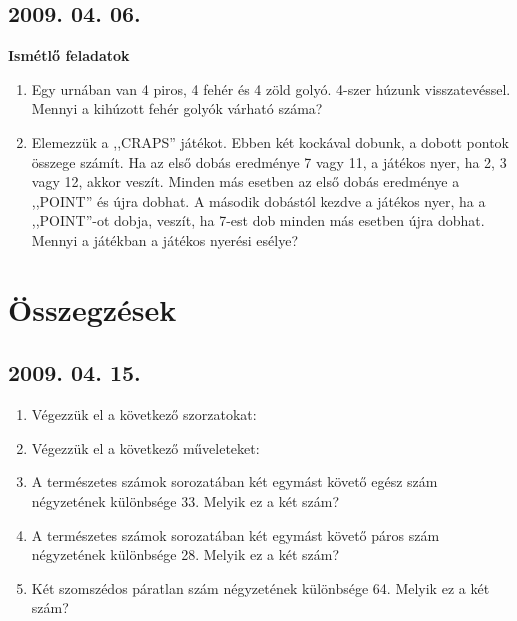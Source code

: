 \subsection*{2009. 04. 06.}
\bf{Ismétlő feladatok} \rm
\begin{enumerate}
\item Egy urnában van 4 piros, 4 fehér és 4 zöld golyó. 4-szer húzunk visszatevéssel. Mennyi a kihúzott fehér golyók várható száma?

\item Elemezzük a ,,CRAPS'' játékot. Ebben két kockával dobunk, a dobott pontok összege számít. 
Ha az első dobás eredménye 7 vagy 11, a játékos nyer, ha 2, 3 vagy 12, akkor veszít. Minden más esetben az első dobás eredménye a ,,POINT'' és újra dobhat. 
A második dobástól kezdve a játékos nyer,  ha a ,,POINT''-ot dobja, veszít, ha 7-est dob minden más esetben újra dobhat. Mennyi a játékban a játékos nyerési esélye?
\end{enumerate}



\section{Összegzések}

\subsection*{2009. 04. 15.}
\begin{enumerate}
\item Végezzük el a következő szorzatokat:


\item Végezzük el a következő műveleteket:



\item A természetes számok sorozatában két egymást követő egész szám négyzetének különbsége 33. Melyik ez a két szám?

\item A természetes számok sorozatában két egymást követő páros szám négyzetének különbsége 28. Melyik ez a két szám?

\item Két szomszédos páratlan szám négyzetének különbsége 64. Melyik ez a két szám?
\end{enumerate}
